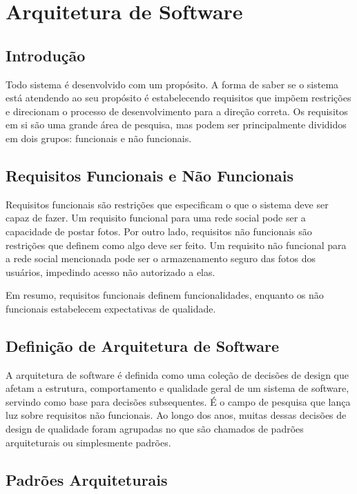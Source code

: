 \chapter{Arquitetura de Software}

\section{Introdução}

Todo sistema é desenvolvido com um propósito. A forma de saber se o sistema está atendendo ao seu propósito é estabelecendo requisitos que impõem restrições e direcionam o processo de desenvolvimento para a direção correta. Os requisitos em si são uma grande área de pesquisa, mas podem ser principalmente divididos em dois grupos: funcionais e não funcionais.

\section{Requisitos Funcionais e Não Funcionais}

Requisitos funcionais são restrições que especificam o que o sistema deve ser capaz de fazer. Um requisito funcional para uma rede social pode ser a capacidade de postar fotos. Por outro lado, requisitos não funcionais são restrições que definem como algo deve ser feito. Um requisito não funcional para a rede social mencionada pode ser o armazenamento seguro das fotos dos usuários, impedindo acesso não autorizado a elas.

Em resumo, requisitos funcionais definem funcionalidades, enquanto os não funcionais estabelecem expectativas de qualidade.

\section{Definição de Arquitetura de Software}

A arquitetura de software é definida como uma coleção de decisões de design que afetam a estrutura, comportamento e qualidade geral de um sistema de software, servindo como base para decisões subsequentes. É o campo de pesquisa que lança luz sobre requisitos não funcionais. Ao longo dos anos, muitas dessas decisões de design de qualidade foram agrupadas no que são chamados de padrões arquiteturais ou simplesmente padrões.

\section{Padrões Arquiteturais}

